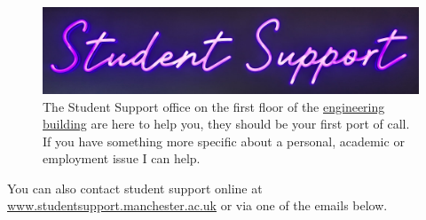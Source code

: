 \documentclass[
  12pt,
]{book}
\begin{document}
\begin{figure}

{\centering \includegraphics[width=1\linewidth]{images/studentsupport} 

}

\caption{The Student Support office on the first floor of the \href{https://www.mecd.manchester.ac.uk/}{engineering building} are here to help you, they should be your first port of call. If you have something more specific about a personal, academic or employment issue I can help.}\label{fig:sso-fig}
\end{figure}



You can also contact student support online at \href{https://www.studentsupport.manchester.ac.uk}{www.studentsupport.manchester.ac.uk} or via one of the emails below.
\end{document}
